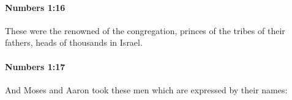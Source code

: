 		\paragraph{Numbers 1:16} %
			\label{NUMBERS-1-16}

			These were the renowned of the congregation, princes of the tribes of their fathers, heads of thousands in Israel.


		\paragraph{Numbers 1:17} %
			\label{NUMBERS-1-17}

			And Moses and Aaron took these men which are expressed by their names:



